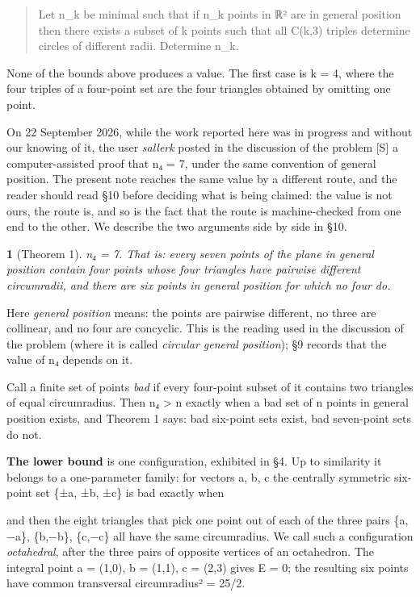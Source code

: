 \documentclass[11pt,a4paper]{article}
\theoremstyle{named}
\newtheorem*{namedthm}{}
\newcommand{\dispf}[1]{\par\smallskip{\centering #1\par}\smallskip}
\begin{document}
\begin{quote}
Let n\_k be minimal such that if n\_k points in ℝ² are in general position then there exists a subset of k points such that all C(k,3) triples determine circles of different radii. Determine n\_k.
\end{quote}

None of the bounds above produces a value. The first case is k = 4, where the four triples of a four-point set are the four triangles obtained by omitting one point.

On 22 September 2026, while the work reported here was in progress and without our knowing of it, the user \textit{sallerk} posted in the discussion of the problem [S] a computer-assisted proof that n₄ = 7, under the same convention of general position. The present note reaches the same value by a different route, and the reader should read §10 before deciding what is being claimed: the value is not ours, the route is, and so is the fact that the route is machine-checked from one end to the other. We describe the two arguments side by side in §10.

\begin{namedthm}[Theorem 1]
n₄ = 7. That is: every seven points of the plane in general position contain four points whose four triangles have pairwise different circumradii, and there are six points in general position for which no four do.
\end{namedthm}

Here \textit{general position} means: the points are pairwise different, no three are collinear, and no four are concyclic. This is the reading used in the discussion of the problem (where it is called \textit{circular general position}); §9 records that the value of n₄ depends on it.

Call a finite set of points \textit{bad} if every four-point subset of it contains two triangles of equal circumradius. Then n₄ \textgreater{} n exactly when a bad set of n points in general position exists, and Theorem 1 says: bad six-point sets exist, bad seven-point sets do not.

\textbf{The lower bound} is one configuration, exhibited in §4. Up to similarity it belongs to a one-parameter family: for vectors a, b, c the centrally symmetric six-point set \{±a, ±b, ±c\} is bad exactly when

\dispf{E(a,b,c) := (a·b)(a×b) + (b·c)(b×c) + (c·a)(c×a) = 0,}

and then the eight triangles that pick one point out of each of the three pairs \{a,−a\}, \{b,−b\}, \{c,−c\} all have the same circumradius. We call such a configuration \textit{octahedral}, after the three pairs of opposite vertices of an octahedron. The integral point a = (1,0), b = (1,1), c = (2,3) gives E = 0; the resulting six points have common transversal circumradius² = 25/2.
\end{document}
